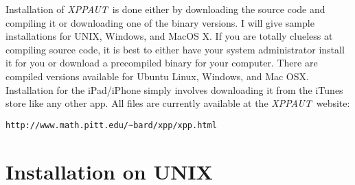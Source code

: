 \documentclass{article}
\newcommand{\XPP}{{\sl XPPAUT\, }}
\begin{document}
Installation of \XPP is done either by
downloading the source code and compiling it or downloading one of the
binary versions. I will give sample installations for UNIX,
Windows, and MacOS X.
 If you are totally clueless at compiling source code, it is best to
either have your system administrator install it for you or download a
precompiled binary for your computer. There are compiled versions
available for Ubuntu Linux, Windows, and Mac OSX. Installation for the
iPad/iPhone simply involves downloading it from the iTunes store like any
other app. All files are currently available at the \XPP website:
\begin{verbatim}
http://www.math.pitt.edu/~bard/xpp/xpp.html
\end{verbatim} 
\section{Installation on UNIX}
\end{document}
